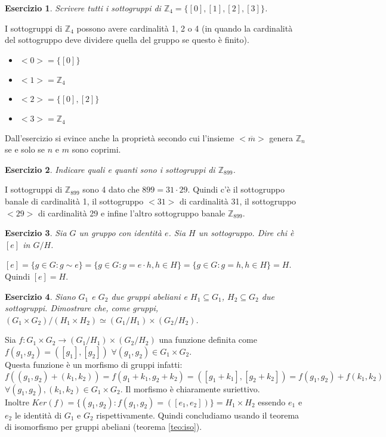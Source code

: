 \documentclass{article}
\theoremstyle{definition}
\theoremstyle{plain}
\theoremstyle{plain}
\theoremstyle{plain}
\theoremstyle{plain}
\newtheorem{esercizio}{Esercizio}
\begin{document}
\begin{esercizio}
    Scrivere tutti i sottogruppi di $\mathbb{Z}_4 = \{[0], [1], [2], [3]\}$.
\end{esercizio}
I sottogruppi di $\mathbb{Z}_4$ possono avere cardinalità 1, 2 o 4 (in quando la cardinalità del sottogruppo deve dividere quella del gruppo se questo è finito).
\begin{itemize}
    \item $<0> = \{[0]\}$ 
    \item $<1> = \mathbb{Z}_4$
    \item $<2> = \{[0], [2]\}$
    \item $<3> = \mathbb{Z}_4$
\end{itemize}
Dall'esercizio si evince anche la proprietà secondo cui l'insieme $<\overline{m}>$ genera $\mathbb{Z}_n$ se e solo se $n$ e $m$ sono coprimi.

\begin{esercizio}
    Indicare quali e quanti sono i sottogruppi di $\mathbb{Z}_{899}$.
\end{esercizio}
I sottogruppi di $\mathbb{Z}_{899}$ sono 4 dato che $899 = 31 \cdot 29$. Quindi c'è il sottogruppo banale di cardinalità 1, il sottogruppo $<31>$ di cardinalità 31, il sottogruppo $<29>$ di cardinalità 29 e infine l'altro sottogruppo banale $\mathbb{Z}_{899}$.

\begin{esercizio}
    Sia $G$ un gruppo con identità $e$. Sia $H$ un sottogruppo. Dire chi è $[e]$ in $G/H$.
\end{esercizio} 
$[e] = \{ g \in G : g \sim e\} = \{ g \in G : g = e \cdot h, h \in H\} = \{ g \in G : g = h, h \in H \} = H$. Quindi $[e] = H$.
\begin{esercizio}
        Siano $G_1$ e $G_2$ due gruppi abeliani e $H_1 \subseteq G_1$, $H_2 \subseteq G_2$ due sottogruppi. Dimostrare che, come gruppi, $(G_1 \times G_2)/(H_1 \times H_2) \simeq (G_1/H_1) \times (G_2/H_2)$.
\end{esercizio}
Sia $f : G_1 \times G_2 \rightarrow (G_1/H_1) \times (G_2/H_2)$ una funzione definita come $f(g_1, g_2) = ([g_1], [g_2])$ $\forall (g_1, g_2) \in G_1 \times G_2$. \\
Questa funzione è un morfismo di gruppi infatti: $f((g_1, g_2) + (k_1, k_2)) = f(g_1+k_1, g_2+k_2) = ([g_1+k_1], [g_2+k_2]) = f(g_1, g_2) + f(k_1, k_2)$ $\forall (g_1, g_2), (k_1, k_2) \in G_1 \times G_2$. Il morfismo è chiaramente suriettivo. \\
Inoltre $Ker(f)=\{(g_1, g_2) : f(g_1, g_2) = ([e_1, e_2])\} = H_1 \times H_2$ essendo $e_1$ e $e_2$ le identità di $G_1$ e $G_2$ rispettivamente. Quindi concludiamo usando il teorema di isomorfismo per gruppi abeliani (teorema \ref{teo:iso}).
\end{document}
